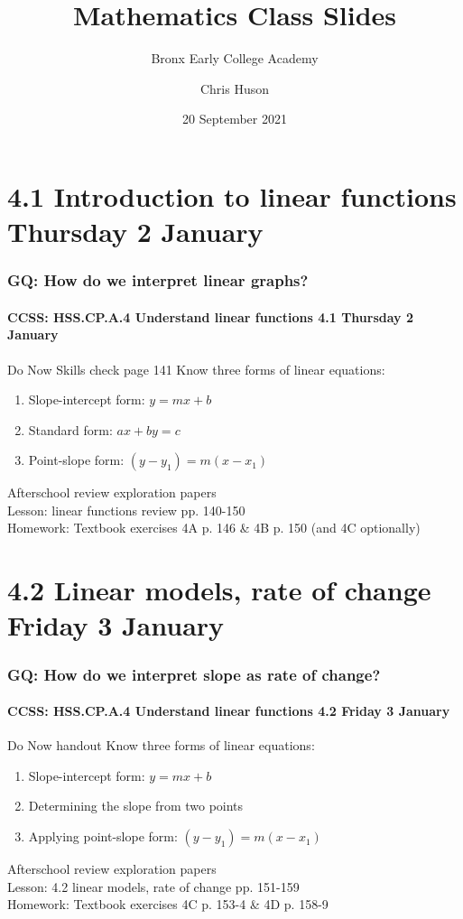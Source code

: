 \documentclass{beamer}
\title{Mathematics Class Slides}
\subtitle{Bronx Early College Academy}
\author{Chris Huson}
\date{20 September 2021}
\begin{document}
\frame{\titlepage}
\section[Outline]{}
\frame{\tableofcontents}

\section{4.1 Introduction to linear functions Thursday 2 January}
\frame
{
  \frametitle{GQ: How do we interpret linear graphs?}
  \framesubtitle{CCSS: HSS.CP.A.4 Understand linear functions \hfill \alert{4.1 Thursday 2 January}}

  \begin{block}{Do Now Skills check page 141}%
    Know three forms of linear equations:
  \begin{enumerate}
      \item Slope-intercept form: $y=mx+b$
      \item Standard form: $ax+by=c$
      \item Point-slope form: $(y-y_1)=m(x-x_1)$
  \end{enumerate}
  \end{block}
  Afterschool review exploration papers\\ \smallskip
  Lesson: linear functions review pp. 140-150 \\ \smallskip
  Homework: Textbook exercises 4A p. 146 \& 4B p. 150 (and 4C optionally)
}

\section{4.2 Linear models, rate of change Friday 3 January}
\frame
{
  \frametitle{GQ: How do we interpret slope as rate of change?}
  \framesubtitle{CCSS: HSS.CP.A.4 Understand linear functions \hfill \alert{4.2 Friday 3 January}}

  \begin{block}{Do Now handout}
    Know three forms of linear equations:
  \begin{enumerate}
      \item Slope-intercept form: $y=mx+b$
      \item Determining the slope from two points
      \item Applying point-slope form: $(y-y_1)=m(x-x_1)$
  \end{enumerate}
  \end{block}
  Afterschool review exploration papers\\ \smallskip
  Lesson: 4.2 linear models, rate of change pp. 151-159 \\ \smallskip
  Homework: Textbook exercises 4C p. 153-4 \& 4D p. 158-9
}
\end{document}
